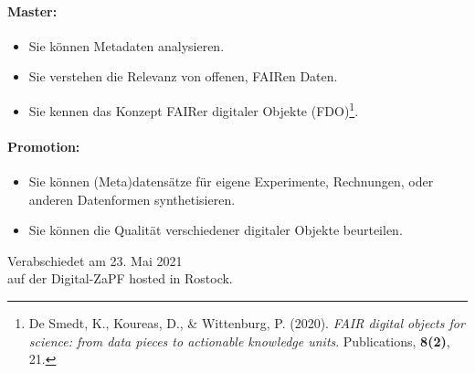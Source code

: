 \documentclass[DIV=calc]{scrartcl}
\begin{document}
\paragraph{Master:}
\begin{itemize}
	\item Sie können Metadaten analysieren.
	\item Sie verstehen die Relevanz von offenen, FAIRen Daten.
	\item Sie kennen das Konzept FAIRer digitaler Objekte (FDO)\footnote{De Smedt, K., Koureas, D., \& Wittenburg, P. (2020). \textit{FAIR digital objects for science: from data pieces
		to actionable knowledge units}. Publications, \textbf{8(2)}, 21.}.
\end{itemize}

\paragraph{Promotion:}
\begin{itemize}
	\item Sie können (Meta)datensätze für eigene Experimente, Rechnungen, oder anderen Datenformen synthetisieren.
	\item Sie können die Qualität verschiedener digitaler Objekte beurteilen.
\end{itemize}


\vfill
\begin{flushright}
	Verabschiedet am 23. Mai 2021 \\
	auf der Digital-ZaPF hosted in Rostock.
\end{flushright}




\end{document}
